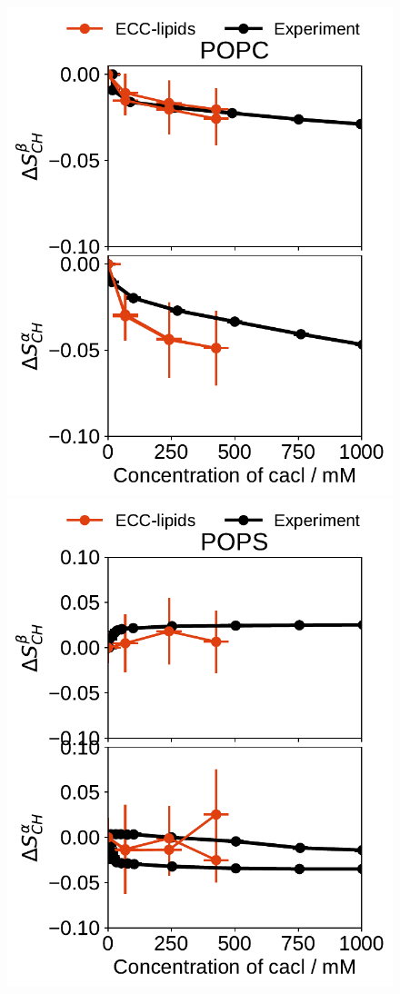 \begin{figure}[htb!]
  \includegraphics[width=\figwidth]{../img/ecc_pops/order_parameters_changes_A-B_POPC_cacl.pdf} 
  \includegraphics[width=\figwidth]{../img/ecc_pops/order_parameters_changes_A-B_POPS_cacl.pdf} 

\end{figure}
